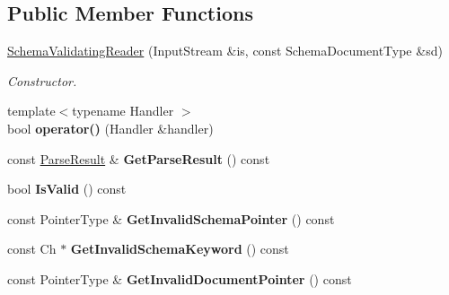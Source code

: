 \subsection*{Public Member Functions}
\begin{DoxyCompactItemize}
\item 
\hyperlink{classSchemaValidatingReader_ae7945b71687ad3dd13b9c3d096892eac}{Schema\+Validating\+Reader} (Input\+Stream \&is, const Schema\+Document\+Type \&sd)
\begin{DoxyCompactList}\small\item\em Constructor. \end{DoxyCompactList}\item 
{\footnotesize template$<$typename Handler $>$ }\\bool {\bfseries operator()} (Handler \&handler)\hypertarget{classSchemaValidatingReader_a7135d8d53aacd850fbce2901cca4a4c3}{}\label{classSchemaValidatingReader_a7135d8d53aacd850fbce2901cca4a4c3}

\item 
const \hyperlink{structParseResult}{Parse\+Result} \& {\bfseries Get\+Parse\+Result} () const \hypertarget{classSchemaValidatingReader_aa5445bcfe27eaa55b28961a0ad6e86c1}{}\label{classSchemaValidatingReader_aa5445bcfe27eaa55b28961a0ad6e86c1}

\item 
bool {\bfseries Is\+Valid} () const \hypertarget{classSchemaValidatingReader_a01576a2c4ee21a6c73071e5f445dc0bd}{}\label{classSchemaValidatingReader_a01576a2c4ee21a6c73071e5f445dc0bd}

\item 
const Pointer\+Type \& {\bfseries Get\+Invalid\+Schema\+Pointer} () const \hypertarget{classSchemaValidatingReader_aaf450fe1f71af00a783d197e81ec6786}{}\label{classSchemaValidatingReader_aaf450fe1f71af00a783d197e81ec6786}

\item 
const Ch $\ast$ {\bfseries Get\+Invalid\+Schema\+Keyword} () const \hypertarget{classSchemaValidatingReader_ac040fa8a06b5950b40f907cc5fbec201}{}\label{classSchemaValidatingReader_ac040fa8a06b5950b40f907cc5fbec201}

\item 
const Pointer\+Type \& {\bfseries Get\+Invalid\+Document\+Pointer} () const \hypertarget{classSchemaValidatingReader_a8e5fb64a2b4c76572501c3b3e611e0fb}{}\label{classSchemaValidatingReader_a8e5fb64a2b4c76572501c3b3e611e0fb}

\end{DoxyCompactItemize}


